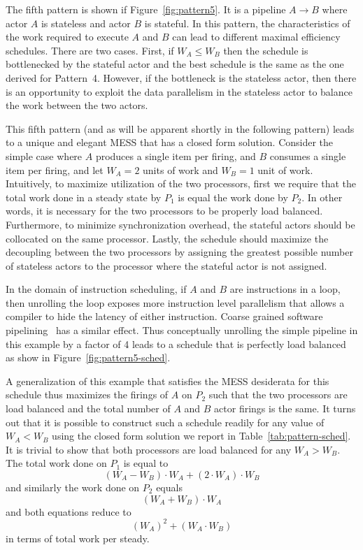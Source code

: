 The fifth pattern is shown if Figure~\ref{fig:pattern5}. It is a
pipeline $A\rightarrow B$ where actor $A$ is stateless and actor $B$
is stateful. In this pattern, the characteristics of the work required
to execute $A$ and $B$ can lead to different maximal efficiency
schedules.  There are two cases. First, if $W_A \le W_B$ then the
schedule is bottlenecked by the stateful actor and the best schedule
is the same as the one derived for Pattern~4. However, if the
bottleneck is the stateless actor, then there is an opportunity to
exploit the data parallelism in the stateless actor to balance the
work between the two actors.

This fifth pattern (and as will be apparent shortly in the following
pattern) leads to a unique and elegant MESS that has a closed form
solution. Consider the simple case where $A$ produces a single item
per firing, and $B$ consumes a single item per firing, and let $W_A =
2$ units of work and $W_B = 1$ unit of work. Intuitively, to maximize
utilization of the two processors, first we require that the total
work done in a steady state by $P_1$ is equal the work done by
$P_2$. In other words, it is necessary for the two processors to be
properly load balanced. Furthermore, to minimize synchronization
overhead, the stateful actors should be collocated on the same
processor. Lastly, the schedule should maximize the decoupling between
the two processors by assigning the greatest possible number of
stateless actors to the processor where the stateful actor is not
assigned.

In the domain of instruction scheduling, if $A$ and $B$ are
instructions in a loop, then unrolling the loop exposes more
instruction level parallelism that allows a compiler to hide the
latency of either instruction. Coarse grained software
pipelining~\cite{mgordon-aplos06} has a similar effect. Thus
conceptually unrolling the simple pipeline in this example by a factor
of 4 leads to a schedule that is perfectly load balanced as show in
Figure~\ref{fig:pattern5-sched}. 

A generalization of this example that satisfies the MESS desiderata
for this schedule thus maximizes the firings of $A$ on $P_2$ such that
the two processors are load balanced and the total number of $A$ and
$B$ actor firings is the same. It turns out that it is possible to
construct such a schedule readily for any value of $W_A < W_B$ using
the closed form solution we report in
Table~\ref{tab:pattern-sched}. It is trivial to show that both
processors are load balanced for any $W_A > W_B$. The total work done
on $P_1$ is equal to
\[
(W_A - W_B) \cdot W_A + (2 \cdot W_A) \cdot W_B
\]
and similarly the work done on $P_2$ equals
\[
(W_A + W_B) \cdot W_A
\]
and both equations reduce to 
\[
(W_A)^2 + (W_A \cdot W_B)
\]
in terms of total work per steady.

